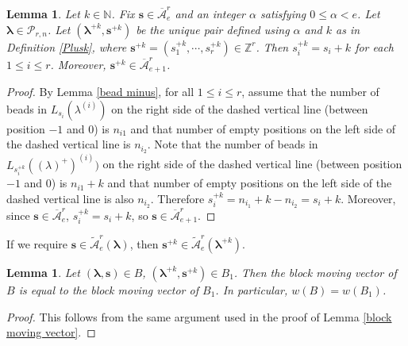 \documentclass[a4paper,10pt]{amsart}
\theoremstyle{plain}
\def\bs{{\boldsymbol{s}}}
\def\N{{\mathbb N}}
\def\Z{{\mathbb Z}}
\def\PP{\mathscr{P}}
\def\blam{{\boldsymbol \lambda}}
\theoremstyle{plain}
\newtheorem{lemma}[theorem]{Lemma}
\numberwithin{equation}{section}
\begin{document}
\begin{lemma} Let $k\in\N$. Fix $\bs \in \overline{\mathcal A}^r_e$ and an integer \(\alpha\) satisfying \(0\le \alpha<e\). Let $\blam\in\PP_{r,n}$. Let $(\blam^{+k},\bs^{+k})$ be the unique pair defined using $\alpha$ and $k$ as in Definition \ref{Plusk}, where  $\bs^{+k}=(s_1^{+k},\cdots,s_r^{+k})\in\Z^r$. Then $s^{+k}_i=s_i+k$ for each $1\leq i\leq r$. Moreover, $\bs^{+k} \in \overline{\mathcal A}^r_{e+1}$.
\end{lemma}

\begin{proof}
By Lemma \ref{bead minus}, for all $1\le i\le r$, assume that the number of beads in $L_{s_i}(\lambda^{(i)})$ on the right side of the dashed vertical line (between position $-1$ and $0$) is $n_{i1}$ and that number of empty positions on the left side of the dashed vertical line is $n_{i_2}$. Note that the number of beads in $L_{s_i^{+k}} ((\lambda)^+)^{(i)})$ on the right side of the dashed vertical line (between position $-1$ and $0$) is  $n_{i1}+k$ and that number of empty positions on the left side of the dashed vertical line is also $n_{i_2}$. Therefore $s_i^{+k}=n_{i_1}+k-n_{i_2}=s_i+k$. Moreover, since $\bs \in \overline{\mathcal A}^r_e$, $s_i^{+k}=s_i+k$, so $\bs \in \overline{\mathcal A}^r_{e+1}$.
\end{proof}

If we require $\bs \in \widetilde{\mathcal A}^r_e(\blam)$, then $\bs^{+k} \in \widetilde{\mathcal A}^r_e (\blam^{+k})$.


\begin{lemma}\label{block moving vector1}
Let $(\blam, \bs) \in B$, $(\blam^{+k}, \bs^{+k}) \in B_1$. Then the block moving vector of $B$ is equal to the block moving vector of $B_1$. In particular, $w(B)=w(B_1)$.
\end{lemma}

\begin{proof} This follows from the same argument used in the proof of Lemma \ref{block moving vector}.
\end{proof}
\end{document}
